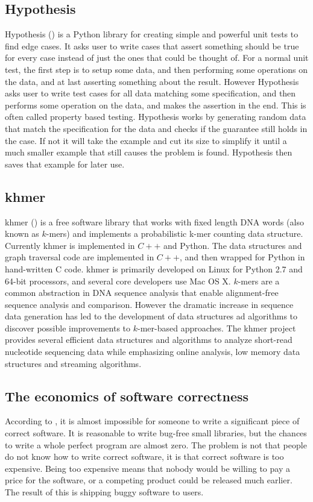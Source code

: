 \documentclass[preprint,nocopyrightspace]{sig-alternate}
\begin{document}
\subsection{Hypothesis}
Hypothesis (\citet{maciver_welcome_2015}) is a Python library for creating simple and powerful unit tests to find edge cases.
It asks user to write cases that assert something should be true for every case instead of just the ones that could be thought of.
For a normal unit test,
the first step is to setup some data,
and then performing some operations on the data,
and at last asserting something about the result.
However Hypothesis asks user to write test cases for all data matching some specification,
and then performs some operation on the data,
and makes the assertion in the end.
This is often called property based testing.
Hypothesis works by generating random data that match the specification for the data and checks if the guarantee still holds in the case.
If not it will take the example and cut its size to simplify it until a much smaller example that still causes the problem is found.
Hypothesis then saves that example for later use.

\subsection{khmer}
khmer (\citet{crusoe_khmer_2015}) is a free software library that works with fixed length DNA words (also known as $k$-mers) and implements a probabilistic k-mer counting data structure.
Currently khmer is implemented in $C++$ and Python.
The data structures and graph traversal code are implemented in $C++$,
and then wrapped for Python in hand-written C code.
khmer is primarily developed on Linux for Python 2.7 and 64-bit processors,
and several core developers use Mac OS X.
$k$-mers are a common abstraction in DNA sequence analysis that enable alignment-free sequence analysis and comparison.
However the dramatic increase in sequence data generation has led to the development of data structures ad algorithms to discover possible improvements to $k$-mer-based approaches.
The khmer project provides several efficient data structures and algorithms to analyze short-read nucleotide sequencing data while emphasizing online analysis,
low memory data structures and streaming algorithms.

\subsection{The economics of software correctness}
According to \citet{maciver_economics_2015},
it is almost impossible for someone to write a significant piece of correct software.
It is reasonable to write bug-free small libraries,
but the chances to write a whole perfect program are almost zero.
The problem is not that people do not know how to write correct software,
it is that correct software is too expensive.
Being too expensive means that nobody would be willing to pay a price for the software,
or a competing product could be released much earlier.
The result of this is shipping buggy software to users.
\end{document}
